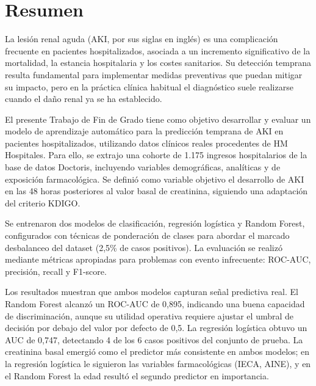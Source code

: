 \documentclass[12pt, a4paper, oneside]{report}
\begin{document}
\newpage
\thispagestyle{empty}
\mbox{}
\newpage


\chapter*{Resumen}
La lesión renal aguda (AKI, por sus siglas en inglés) es una complicación frecuente en pacientes hospitalizados, asociada a un incremento significativo de la mortalidad, la estancia hospitalaria y los costes sanitarios. Su detección temprana resulta fundamental para implementar medidas preventivas que puedan mitigar su impacto, pero en la práctica clínica habitual el diagnóstico suele realizarse cuando el daño renal ya se ha establecido.

El presente Trabajo de Fin de Grado tiene como objetivo desarrollar y evaluar un modelo de aprendizaje automático para la predicción temprana de AKI en pacientes hospitalizados, utilizando datos clínicos reales procedentes de HM Hospitales. Para ello, se extrajo una cohorte de 1.175 ingresos hospitalarios de la base de datos Doctoris, incluyendo variables demográficas, analíticas y de exposición farmacológica. Se definió como variable objetivo el desarrollo de AKI en las 48 horas posteriores al valor basal de creatinina, siguiendo una adaptación del criterio KDIGO.

Se entrenaron dos modelos de clasificación, regresión logística y Random Forest, configurados con técnicas de ponderación de clases para abordar el marcado desbalanceo del dataset (2,5\% de casos positivos). La evaluación se realizó mediante métricas apropiadas para problemas con evento infrecuente: ROC-AUC, precisión, recall y F1-score.

Los resultados muestran que ambos modelos capturan señal predictiva real. El Random Forest alcanzó un ROC-AUC de 0,895, indicando una buena capacidad de discriminación, aunque su utilidad operativa requiere ajustar el umbral de decisión por debajo del valor por defecto de 0,5. La regresión logística obtuvo un AUC de 0,747, detectando 4 de los 6 casos positivos del conjunto de prueba. La creatinina basal emergió como el predictor más consistente en ambos modelos; en la regresión logística le siguieron las variables farmacológicas (IECA, AINE), y en el Random Forest la edad resultó el segundo predictor en importancia.
\end{document}
